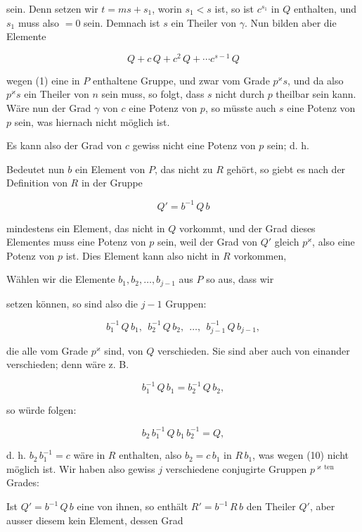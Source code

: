
sein. Denn setzen wir $t = m s + s_1$, worin $s_1 < s$ ist, so ist $c^{s_1}$
in $Q$ enthalten, und $s_1$ muss also $= 0$ sein. Demnach ist $s$ ein
Theiler von $\gamma$. Nun bilden aber die Elemente

\[
Q + c\,Q + c^2\,Q + \cdots c^{s-1}\,Q
\]

wegen (1) eine in $P$ enthaltene Gruppe, und zwar vom Grade $p^{\varkappa} s$,
und da also $p^{\varkappa} s$ ein Theiler von $n$ sein muss, so folgt, dass $s$
nicht durch $p$ theilbar sein kann. Wäre nun der Grad $\gamma$ von $c$
eine Potenz von $p$, so müsste auch $s$ eine Potenz von $p$ sein, was
hiernach nicht möglich ist.

Es kann also der Grad von $c$ gewiss nicht eine Potenz von
$p$ sein; d. h. 

Bedeutet nun $b$ ein Element von $P$, das nicht zu $R$ gehört,
so giebt es nach der Definition von $R$ in der Gruppe

\[
Q' = b^{-1}\,Q\,b
\]

mindestens ein Element, das nicht in $Q$ vorkommt, und der
Grad dieses Elementes muss eine Potenz von $p$ sein, weil der
Grad von $Q'$ gleich $p^{\varkappa}$, also eine Potenz von $p$ ist. Dies Element
kann also nicht in $R$ vorkommen, 

Wählen wir die Elemente $b_1, b_2, \ldots, b_{j-1}$ aus $P$ so aus,
dass wir


setzen können, so sind also die $j - 1$ Gruppen:

\[
b_1^{-1}\,Q\,b_1,\ \ b_2^{-1}\,Q\,b_2,\ \ \ldots,\ \ b_{j-1}^{-1}\,Q\,b_{j-1},
\]

die alle vom Grade $p^{\varkappa}$ sind, von $Q$ verschieden. Sie sind aber
auch von einander verschieden; denn wäre z. B.

\[
b_1^{-1}\,Q\,b_1 = b_2^{-1}\,Q\,b_2,
\]

so würde folgen:

\[
b_2\,b_1^{-1}\,Q\,b_1\,b_2^{-1} = Q,
\]

d. h. $b_2\,b_1^{-1} = c$ wäre in $R$ enthalten, also $b_2 = c\,b_1$ in $R\,b_1$, was
wegen (10) nicht möglich ist. Wir haben also gewiss $j$ verschiedene
conjugirte Gruppen $p^{\varkappa\,\mathrm{ten}}$ Grades:


Ist $Q' = b^{-1}\,Q\,b$ eine von ihnen, so enthält $R' = b^{-1}\,R\,b$
den Theiler $Q'$, aber ausser diesem kein Element, dessen Grad

